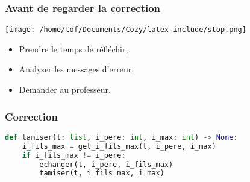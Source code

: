 \documentclass[svgnames,11pt]{beamer}
\begin{document}
\begin{frame}
    \frametitle{Avant de regarder la correction}
    \begin{center}
        \centering
        \texttt{[image: /home/tof/Documents/Cozy/latex-include/stop.png]}
    \end{center}
    {\Large
    \begin{itemize}
        \item Prendre le temps de réfléchir,
        \item Analyser les messages d'erreur,
        \item Demander au professeur.
    \end{itemize}
    }
\end{frame}
\begin{frame}[fragile]
    \frametitle{Correction}

    \begin{center}
        \begin{lstlisting}[language=Python , basicstyle=\ttfamily\small, xleftmargin=.5em, xrightmargin=-1em]
def tamiser(t: list, i_pere: int, i_max: int) -> None:
    i_fils_max = get_i_fils_max(t, i_pere, i_max)
    if i_fils_max != i_pere:
        echanger(t, i_pere, i_fils_max)
        tamiser(t, i_fils_max, i_max)
\end{lstlisting}
    \end{center}

\end{frame}
\end{document}
